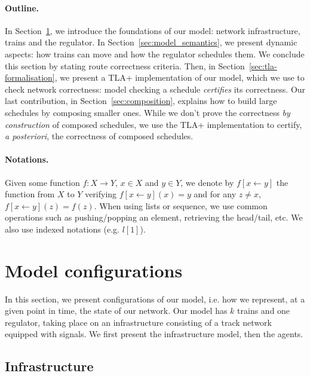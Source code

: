 \documentclass[runningheads]{llncs}
\begin{document}
\paragraph{Outline.}
In Section~\ref{sec:model_configurations}, we introduce the foundations of our model: network infrastructure, trains and the regulator. In Section~\ref{sec:model_semantics}, we present dynamic aspects: how trains can move and how the regulator schedules them. We conclude this section by stating route correctness criteria. Then, in Section~\ref{sec:tla-formalisation}, we present a TLA+ implementation of our model, which we use to check network correctness: model checking a schedule \emph{certifies} its correctness. Our last contribution, in Section~\ref{sec:composition}, explains how to build large schedules by composing smaller ones. While we don't prove the correctness \emph{by construction} of composed schedules, we use the TLA+ implementation to certify, \emph{a posteriori}, the correctness of composed schedules.



\paragraph{Notations.}

Given some function $f: X \to Y$, $x \in X$ and $y \in Y$, we denote by $f[x \leftarrow y]$ the function from $X$ to $Y$ verifying $f[x \leftarrow y](x) = y$ and for any $z \neq x$, $f[x \leftarrow y](z) = f(z)$. When using lists or sequence, we use common operations such as pushing/popping an element, retrieving the head/tail, etc. We also use indexed notations (e.g. $l[1]$).

\section{Model configurations}
\label{sec:model_configurations}

In this section, we present configurations of our model, i.e. how we represent, at a given point in time, the state of our network. 
Our model has $k$ trains and one regulator, taking place on an infrastructure consisting of a track network equipped with signals. We first present the infrastructure model, then the agents.

\subsection{Infrastructure}
\end{document}
